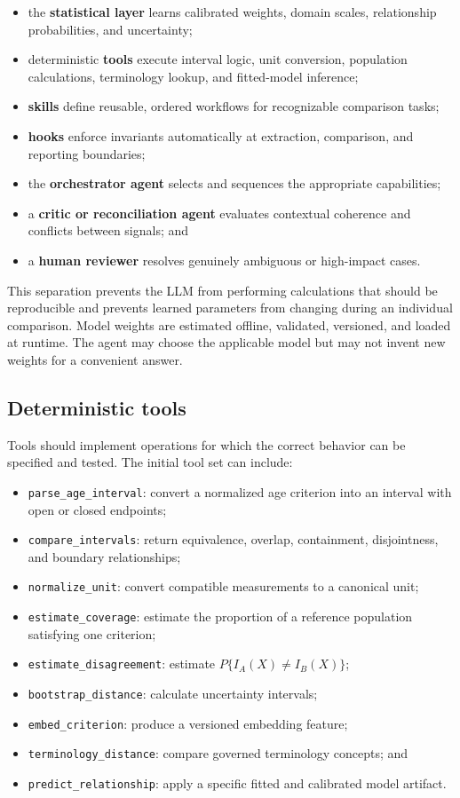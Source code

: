 \documentclass[11pt]{article}
\begin{document}
\begin{itemize}
    \item the \textbf{statistical layer} learns calibrated weights, domain scales, relationship probabilities, and uncertainty;
    \item deterministic \textbf{tools} execute interval logic, unit conversion, population calculations, terminology lookup, and fitted-model inference;
    \item \textbf{skills} define reusable, ordered workflows for recognizable comparison tasks;
    \item \textbf{hooks} enforce invariants automatically at extraction, comparison, and reporting boundaries;
    \item the \textbf{orchestrator agent} selects and sequences the appropriate capabilities;
    \item a \textbf{critic or reconciliation agent} evaluates contextual coherence and conflicts between signals; and
    \item a \textbf{human reviewer} resolves genuinely ambiguous or high-impact cases.
\end{itemize}

This separation prevents the LLM from performing calculations that should be reproducible and prevents learned parameters from changing during an individual comparison. Model weights are estimated offline, validated, versioned, and loaded at runtime. The agent may choose the applicable model but may not invent new weights for a convenient answer.

\subsection{Deterministic tools}

Tools should implement operations for which the correct behavior can be specified and tested. The initial tool set can include:

\begin{itemize}
    \item \texttt{parse\_age\_interval}: convert a normalized age criterion into an interval with open or closed endpoints;
    \item \texttt{compare\_intervals}: return equivalence, overlap, containment, disjointness, and boundary relationships;
    \item \texttt{normalize\_unit}: convert compatible measurements to a canonical unit;
    \item \texttt{estimate\_coverage}: estimate the proportion of a reference population satisfying one criterion;
    \item \texttt{estimate\_disagreement}: estimate $P\{I_A(X)\neq I_B(X)\}$;
    \item \texttt{bootstrap\_distance}: calculate uncertainty intervals;
    \item \texttt{embed\_criterion}: produce a versioned embedding feature;
    \item \texttt{terminology\_distance}: compare governed terminology concepts; and
    \item \texttt{predict\_relationship}: apply a specific fitted and calibrated model artifact.
\end{itemize}
\end{document}
